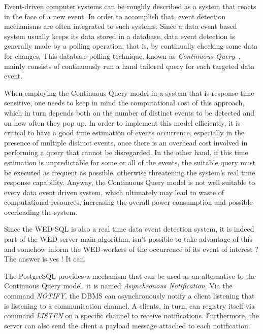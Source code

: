 \documentclass[12pt]{article}
\begin{document}
Event-driven computer systems can be roughly described as a system that reacts in the face of a new event. In order to 
accomplish that, event detection mechanisms are often integrated to such systems. Since a data event based system usually keeps
its data stored in a database, data event detection is generally made by a polling operation, that is, by continually checking
some data for changes. This database polling technique, known as \emph{Continuous Query}~\cite{CQ}, mainly consists of 
continuously run a hand tailored query for each targeted data event.     

\par When employing the Continuous Query model in a system that is response time sensitive, one needs to keep in mind the
computational cost of this approach, which in turn depends both on the number of distinct events to be detected and on how 
often they pop up. In order to implement this model efficiently, it is critical to have a good time estimation of events
occurrence, especially in the presence of multiple distinct events, once there is an overhead cost involved in performing
a query that cannot be disregarded. In the other hand, if this time estimation is unpredictable for some or all of the
events, the suitable query must be executed as frequent as possible, otherwise threatening the system's real time response 
capability. Anyway, the Continuous Query model is not well suitable to every data event driven system, which ultimately
may lead to waste of computational resources, increasing the overall power consumption and possible overloading the system.     
  
\par Since the WED-SQL is also a real time data event detection system, it is indeed part of the WED-server main algorithm,
isn't possible to take advantage of this and somehow inform the WED-workers of the occurrence of its event of interest ?
The answer is yes ! It can.    

\par The PostgreSQL provides a mechanism that can be used as an alternative to the Continuous Query model, it is named 
\emph{Asynchronous Notification}. Via the command \emph{NOTIFY}, the DBMS can asynchronously notify a client listening that 
is listening to a communication channel. A clients, in turn, can registry itself via command \emph{LISTEN} on a specific  
channel to receive notifications. Furthermore, the server can also send the client a payload message attached to each
notification. 
\end{document}
